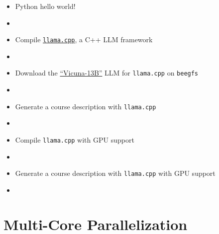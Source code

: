\documentclass[12pt,aspectratio=169,xcolor=dvipsnames,hyperref={colorlinks,urlcolor=iiia_orange}]{beamer}
\begin{document}
\begin{frame}{}
    \begin{itemize}
        \setlength\itemsep{-1pt}
        \item[\faGithub] Python hello world!
        \item[] 
        \item[\faGithub] Compile \href{https://github.com/ggerganov/llama.cpp}{\texttt{llama.cpp}}, a C++ LLM framework
        \item[] 
        \item[\faGithub] Download the \href{https://lmsys.org/blog/2023-03-30-vicuna}{``Vicuna-13B''} LLM for \texttt{llama.cpp} on \texttt{beegfs}
        \item[] 
        \item[\faGithub] Generate a course description with \texttt{llama.cpp}
        \item[] 
        \item[\faGithub] Compile \texttt{llama.cpp} with GPU support
        \item[] 
        \item[\faGithub] Generate a course description with \texttt{llama.cpp} with GPU support
        \item[] 
    \end{itemize}
\end{frame}

\section{Multi-Core Parallelization}

\end{document}
